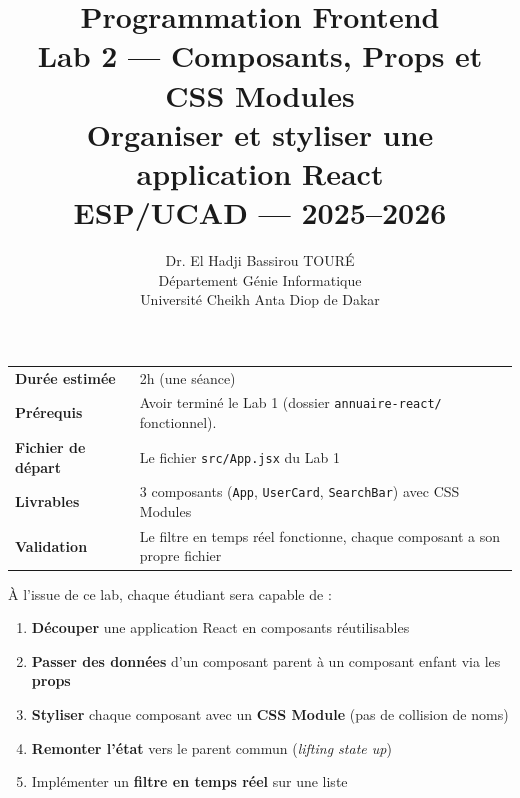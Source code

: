 \documentclass[11pt,a4paper]{article}
\title{%
\vspace{-1cm}
\textbf{\LARGE Programmation Frontend}\\[0.8cm]
\textbf{\huge Lab 2 --- Composants, Props et CSS Modules}\\[0.3cm]
\textbf{\Large Organiser et styliser une application React}\\[0.5cm]
\large ESP/UCAD --- 2025--2026}
\author{Dr. El Hadji Bassirou TOURÉ\\
Département Génie Informatique\\
Université Cheikh Anta Diop de Dakar}
\date{}
\begin{document}
\maketitle
\thispagestyle{empty}

\vspace{0.5cm}

\begin{prereqbox}
\begin{center}
\begin{tabular}{lp{10cm}}
\toprule
\textbf{Durée estimée} & 2h (une séance) \\
\textbf{Prérequis} & Avoir terminé le Lab 1 (dossier \texttt{annuaire-react/} fonctionnel). \\
\textbf{Fichier de départ} & Le fichier \texttt{src/App.jsx} du Lab 1 \\
\textbf{Livrables} & 3 composants (\texttt{App}, \texttt{UserCard}, \texttt{SearchBar}) avec CSS Modules \\
\textbf{Validation} & Le filtre en temps réel fonctionne, chaque composant a son propre fichier \\
\bottomrule
\end{tabular}
\end{center}
\end{prereqbox}

\begin{objectifbox}
À l'issue de ce lab, chaque étudiant sera capable de :
\begin{enumerate}[nosep]
    \item \textbf{Découper} une application React en composants réutilisables
    \item \textbf{Passer des données} d'un composant parent à un composant enfant via les \textbf{props}
    \item \textbf{Styliser} chaque composant avec un \textbf{CSS Module} (pas de collision de noms)
    \item \textbf{Remonter l'état} vers le parent commun (\emph{lifting state up})
    \item Implémenter un \textbf{filtre en temps réel} sur une liste
\end{enumerate}
\end{objectifbox}

\tableofcontents

\newpage
\end{document}
